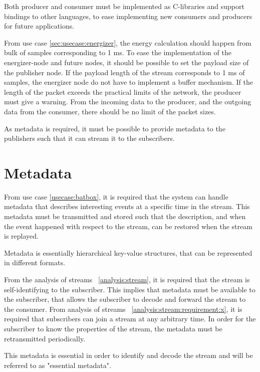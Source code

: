 Both producer and consumer must be implemented as C-libraries and support bindings to other languages, to ease implementing new consumers and producers for future applications.

From use case \ref{sec:usecase:energizer}, the energy calculation should happen from bulk of samples corresponding to 1 ms. To ease the implementation of the energizer-node and future nodes, it should be possible to set the payload size of the publisher node. If the payload length of the stream corresponds to 1 ms of samples, the energizer node do not have to implement a buffer mechanism. If the length of the packet exceeds the practical limits of the network, the producer must give a warning. From the incoming data to the producer, and the outgoing data from the consumer, there should be no limit of the packet sizes.

As metadata is required, it must be possible to provide metadata to the publishers such that it can stream it to the subscribers. 

\section{Metadata}
From use case \ref{usecase:batbox}, it is required that the system can handle metadata that describes interesting events at a specific time in the stream. This metadata must be transmitted and stored such that the description, and when the event happened with respect to the stream, can be restored when the stream is replayed. 

Metadata is essentially hierarchical key-value structures, that can be represented in different formats.

From the analysis of streams ~\ref{analysis:stream}, it is required that the stream is self-identifying to the subscriber. This implies that metadata must be available to the subscriber, that allows the subscriber to decode and forward the stream to the consumer. 
From analysis of streams ~\ref{analysis:stream:requirement:x}, it is required that subscribers can join a stream at any arbitrary time. In order for the subscriber to know the properties of the stream, the metadata must be retransmitted periodically.

This metadata is essential in order to identify and decode the stream and will be referred to as "essential metadata".\\

